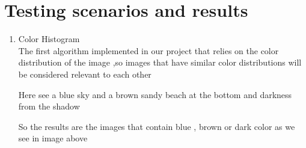 \documentclass[pdftex,10pt,a4paper,oneside]{article}
\begin{document}
	
	
	
	\pagebreak
	\section{Testing scenarios and results}

	\begin{enumerate}
		\item Color Histogram \\
		The first algorithm implemented  in our project that relies on the color distribution of the image ,so images that have similar color distributions will be considered relevant to each other
	
	Here see a blue sky and a brown sandy beach at the bottom and darkness from the shadow
	
So the results are the images that contain blue , brown or dark color as we see in image above


		
	\end{enumerate}

	\pagebreak
\end{document}
